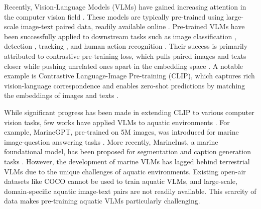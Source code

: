 Recently, Vision-Language Models (VLMs) have gained increasing attention in the computer vision field \cite{radford2021learning, sammani2022nlx, mu2024embodiedgpt, maniparambil2023enhancing, yan2021videogpt}.
These models are typically pre-trained using large-scale image-text paired data, readily available online \cite{radford2021learning, singh2022flava, zhang2024vision}.
Pre-trained VLMs have been successfully applied to downstream tasks such as image classification \cite{naeem2023i2mvformer}, detection \cite{zhu2020don}, tracking \cite{li2023citetracker}, and human action recognition \cite{sun2022human}.
Their success is primarily attributed to contrastive pre-training loss, which pulls paired images and texts closer while pushing unrelated ones apart in the embedding space \cite{li2021supervision, radford2021learning}.
A notable example is Contrastive Language-Image Pre-training (CLIP), which captures rich vision-language correspondence and enables zero-shot predictions by matching the embeddings of images and texts \cite{radford2021learning,zhang2024vision}.

While significant progress has been made in extending CLIP to various computer vision tasks, few works have applied VLMs to aquatic environments \cite{zheng2024coralscop, zheng2023marinegpt,ziqiang2024marineinst}.
For example, MarineGPT, pre-trained on 5M images, was introduced for marine image-question answering tasks \cite{zheng2023marinegpt}.
More recently, MarineInst, a marine foundational model, has been proposed for segmentation and caption generation tasks \cite{ziqiang2024marineinst}.
However, the development of marine VLMs has lagged behind terrestrial VLMs due to the unique challenges of aquatic environments. 
Existing open-air datasets like COCO \cite{lin2014microsoft} cannot be used to train aquatic VLMs, and large-scale, domain-specific aquatic image-text pairs are not readily available. 
This scarcity of data makes pre-training aquatic VLMs particularly challenging.

